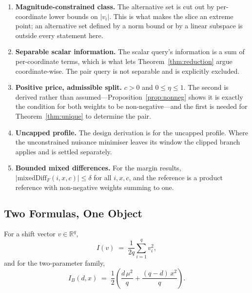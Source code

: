 \begin{enumerate}
\item[1)] \textbf{Magnitude-constrained class.} The alternative set is cut out by
per-coordinate lower bounds on $|v_{i}|$. This is what makes the slice an extreme point; an
alternative set defined by a norm bound or by a linear subspace is outside every statement
here.

\item[2)] \textbf{Separable scalar information.} The scalar query's information is a sum of
per-coordinate terms, which is what lets Theorem~\ref{thm:reduction} argue coordinate-wise.
The pair query is not separable and is explicitly excluded.

\item[3)] \textbf{Positive price, admissible split.} $c>0$ and $0\le\eta\le1$. The second is
derived rather than assumed---Proposition~\ref{prop:nonneg} shows it is exactly the condition
for both weights to be non-negative---and the first is needed for
Theorem~\ref{thm:unique} to determine the pair.

\item[4)] \textbf{Uncapped profile.} The design derivation is for the uncapped profile. Where
the unconstrained nuisance minimiser leaves its window the clipped branch applies and is
settled separately.

\item[5)] \textbf{Bounded mixed differences.} For the margin results,
$|\mathrm{mixedDiff}_{F}(i,x,c)|\le\delta$ for all $i,x,c$, and the reference is a product
reference with non-negative weights summing to one.
\end{enumerate}

\subsection{Two Formulas, One Object}
\label{sec:reduction}

\begin{definition}
For a shift vector $v\in\mathbb{R}^{q}$,
\begin{equation}
I(v)\;=\;\frac{1}{2q}\sum_{i=1}^{q} v_{i}^{2},
\label{eq:igen}
\end{equation}
and for the two-parameter family,
\begin{equation}
I_{B}(d,x)\;=\;\frac{1}{2}\left(\frac{d\,\mu^{2}}{q}+\frac{(q-d)\,x^{2}}{q}\right).
\label{eq:ib}
\end{equation}
\end{definition}

